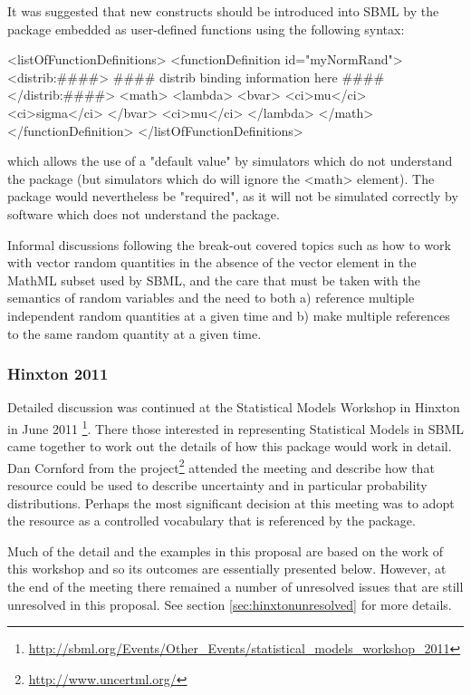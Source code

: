 \documentclass[draftspec]{sbmlpkgspec}
\begin{document}
It was suggested that new constructs should be introduced into SBML by
the package embedded as user-defined functions using the following
syntax:

\begin{example}
<listOfFunctionDefinitions>
  <functionDefinition id="myNormRand">
    <distrib:####>
      #### distrib binding information here ####
    </distrib:####>
    <math>
      <lambda>
        <bvar>
          <ci>mu</ci>
          <ci>sigma</ci>
        </bvar>
        <ci>mu</ci>
      </lambda>
    </math>
  </functionDefinition>
</listOfFunctionDefinitions>
\end{example}

which allows the use of a "default value" by simulators which do not
understand the package (but simulators which do will ignore the <math>
element). The package would nevertheless be "required", as it will not
be simulated correctly by software which does not understand the
package.

Informal discussions following the break-out covered topics such as
how to work with vector random quantities in the absence of the vector
element in the MathML subset used by SBML, and the care that must be
taken with the semantics of random variables and the need to both a)
reference multiple independent random quantities at a given time and
b) make multiple references to the same random quantity at a given
time.

\subsubsection{Hinxton 2011}

Detailed discussion was continued at the Statistical Models Workshop
in Hinxton in June 2011%
\footnote{\url{http://sbml.org/Events/Other_Events/statistical_models_workshop_2011}}. There
those interested in representing Statistical Models in SBML came
together to work out the details of how this package would work in
detail. Dan Cornford from the \uncertml
project\footnote{\url{http://www.uncertml.org/}} attended the meeting
and describe how that resource could be used to describe uncertainty
and in particular probability distributions. Perhaps the most
significant decision at this meeting was to adopt the \uncertml
resource as a controlled vocabulary that is referenced by the \distrib package.

Much of the detail and the examples in this proposal are based on
the work of this workshop and so its outcomes are essentially
presented below. However, at the end of the meeting there remained a
number of unresolved issues that are still unresolved in this
proposal. See section \vref{sec:hinxtonunresolved} for more details.
\end{document}
